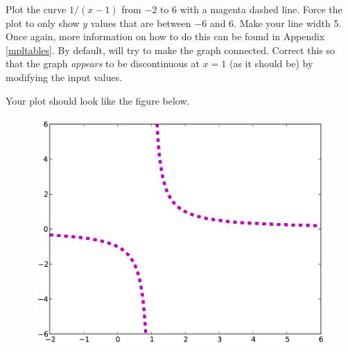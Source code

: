 	
\begin{problem}
Plot the curve $1/(x-1)$ from $-2$ to $6$ with a magenta dashed line.
Force the plot to only show $y$ values that are between $-6$ and $6$.
Make your line width 5. Once again, more information on how to do this can be found in Appendix \ref{mpltables}.
By default,  will try to make the graph connected.
Correct this so that the graph \emph{appears} to be discontinuous at $x=1$ (as it should be) by modifying the input values.

Your plot should look like the figure below.

\begin{figure}[H]
\includegraphics[width=\textwidth]{soln2.pdf}
\label{fig:problem2}
\end{figure}
\end{problem}

